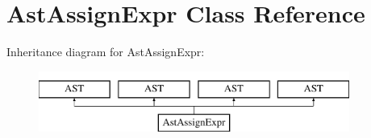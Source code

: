 \hypertarget{classAstAssignExpr}{\section{Ast\-Assign\-Expr Class Reference}
\label{classAstAssignExpr}
}
Inheritance diagram for Ast\-Assign\-Expr\-:\begin{figure}[H]
\begin{center}
\leavevmode
\includegraphics[height=2.000000cm]{classAstAssignExpr}
\end{center}
\end{figure}
